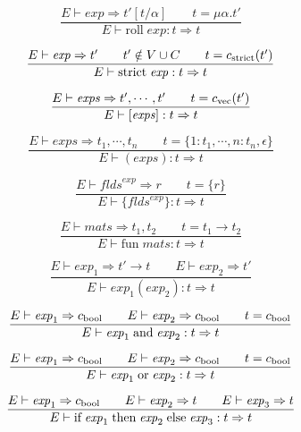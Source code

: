 \documentclass[twoside]{article}
\newcommand{\x}[1]{\mathit{#1}}
\newcommand{\f}[1]{\mbox{#1}}
\renewcommand{\c}[1]{c_{\f{\scriptsize #1}}}
\renewcommand{\exp}{\x{exp}}
\newcommand{\exps}{\x{exps}}
\newcommand{\flds}{\x{flds}}
\newcommand{\mats}{\x{mats}}
\begin{document}
\begin{equation}
\frac{
E \vdash \exp \Rightarrow t'[t/\alpha]
\qquad
t = \mu \alpha.t'
}{
E \vdash \f{roll}\;\exp : t \Rightarrow t
}
\end{equation}

\begin{equation}
\frac{
E \vdash \exp \Rightarrow t'
\qquad
t' \notin V \cup C
\qquad
t = \c{strict}(t')
}{
E \vdash \f{strict}\;\exp : t \Rightarrow t
}
\end{equation}

\begin{equation}
\frac{
E \vdash \exps \Rightarrow t',\cdots,t'
\qquad
t = \c{vec}(t')
}{
E \vdash [\exps] : t \Rightarrow t
}
\end{equation}

\begin{equation}
\frac{
E \vdash \exps \Rightarrow t_1,\cdots,t_n
\qquad
t = \{1:t_1,\cdots,n:t_n,\epsilon\}
}{
E \vdash (\exps) : t \Rightarrow t
}
\end{equation}

\begin{equation}
\frac{
E \vdash \flds^\exp \Rightarrow r
\qquad
t = \{r\}
}{
E \vdash \{\flds^\exp\} : t \Rightarrow t
}
\end{equation}

\begin{equation}
\frac{
E \vdash \mats \Rightarrow t_1,t_2
\qquad
t = t_1 \to t_2
}{
E \vdash \f{fun}\;\mats : t \Rightarrow t
}
\end{equation}

\begin{equation}
\frac{
E \vdash \exp_1 \Rightarrow t' \to t
\qquad
E \vdash \exp_2 \Rightarrow t'
}{
E \vdash \exp_1(\exp_2) : t \Rightarrow t
}
\end{equation}

\begin{equation}
\frac{
E \vdash \exp_1 \Rightarrow \c{bool}
\qquad
E \vdash \exp_2 \Rightarrow \c{bool}
\qquad
t = \c{bool}
}{
E \vdash \exp_1\;\f{and}\;\exp_2 : t \Rightarrow t
}
\end{equation}

\begin{equation}
\frac{
E \vdash \exp_1 \Rightarrow \c{bool}
\qquad
E \vdash \exp_2 \Rightarrow \c{bool}
\qquad
t = \c{bool}
}{
E \vdash \exp_1\;\f{or}\;\exp_2 : t \Rightarrow t
}
\end{equation}

\begin{equation}
\frac{
E \vdash \exp_1 \Rightarrow \c{bool}
\qquad
E \vdash \exp_2 \Rightarrow t
\qquad
E \vdash \exp_3 \Rightarrow t
}{
E \vdash \f{if}\;\exp_1\;\f{then}\;\exp_2\;\f{else}\;\exp_3 : t \Rightarrow t
}
\end{equation}
\end{document}
